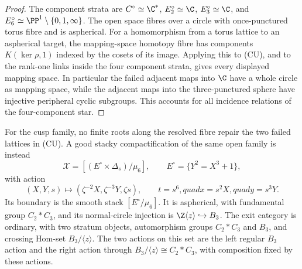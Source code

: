 \begin{proof}
The component strata are $C^\circ\simeq\C^*$,
$E_2^\circ\simeq\C$, $E_3^\circ\simeq\C$, and
$E_6^\circ\simeq\PP^1\setminus\{0,1,\infty\}$.
The open space fibres over a circle with once-punctured torus fibre and is
aspherical.  For a homomorphism from a torus lattice to an aspherical target,
the mapping-space homotopy fibre has components $K(\ker\rho,1)$ indexed by
the cosets of its image.  Applying this to (CU), and to the rank-one links
inside the four component strata, gives every displayed mapping space.
In particular the failed adjacent maps into $\C$ have a whole circle as
mapping space, while the adjacent maps into the three-punctured sphere have
injective peripheral cyclic subgroups.  This accounts for all incidence
relations of the four-component star.
\end{proof}

\begin{theorem}\label{P1e-cusp-stack}
For the cusp family, no finite roots along the resolved fibre repair the two
failed lattices in (CU).  A good stacky compactification of the same open
family is instead
\[
 \mathcal X=[(E^\circ\times\Delta_s)/\mu_6],\qquad
 E^\circ=\{Y^2=X^3+1\},
\]
with action
\[
 (X,Y,s)\longmapsto(\zeta^{-2}X,\zeta^{-3}Y,\zeta s),
 \qquad t=s^6,quad x=s^2X,quad y=s^3Y.
\]
Its boundary is the smooth stack $[E^\circ/\mu_6]$.  It is aspherical, with
fundamental group $C_2*C_3$, and its normal-circle injection is
$\Z\langle z\rangle\hookrightarrow B_3$.
The exit category is ordinary, with two stratum objects, automorphism groups
$C_2*C_3$ and $B_3$, and crossing Hom-set $B_3/\langle z\rangle$.
The two actions on this set are the left regular $B_3$ action and the right
action through $B_3/\langle z\rangle\cong C_2*C_3$, with composition fixed by
these actions.
\end{theorem}
